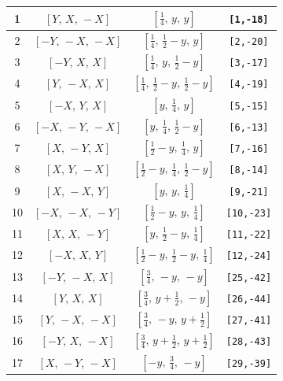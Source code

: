 \documentclass[fleqn,8pt]{jsarticle}
\begin{document}
\begin{longtable}{cccc}
1 & $\left[ Y,\, X,\, - X \right]$ & $\left[ \frac{1}{4},\, y,\, y \right]$ & {\tt [1,-18]} \\ \hline
2 & $\left[ - Y,\, - X,\, - X \right]$ & $\left[ \frac{1}{4},\, \frac{1}{2} - y,\, y \right]$ & {\tt [2,-20]} \\ \hline
3 & $\left[ - Y,\, X,\, X \right]$ & $\left[ \frac{1}{4},\, y,\, \frac{1}{2} - y \right]$ & {\tt [3,-17]} \\ \hline
4 & $\left[ Y,\, - X,\, X \right]$ & $\left[ \frac{1}{4},\, \frac{1}{2} - y,\, \frac{1}{2} - y \right]$ & {\tt [4,-19]} \\ \hline
5 & $\left[ - X,\, Y,\, X \right]$ & $\left[ y,\, \frac{1}{4},\, y \right]$ & {\tt [5,-15]} \\ \hline
6 & $\left[ - X,\, - Y,\, - X \right]$ & $\left[ y,\, \frac{1}{4},\, \frac{1}{2} - y \right]$ & {\tt [6,-13]} \\ \hline
7 & $\left[ X,\, - Y,\, X \right]$ & $\left[ \frac{1}{2} - y,\, \frac{1}{4},\, y \right]$ & {\tt [7,-16]} \\ \hline
8 & $\left[ X,\, Y,\, - X \right]$ & $\left[ \frac{1}{2} - y,\, \frac{1}{4},\, \frac{1}{2} - y \right]$ & {\tt [8,-14]} \\ \hline
9 & $\left[ X,\, - X,\, Y \right]$ & $\left[ y,\, y,\, \frac{1}{4} \right]$ & {\tt [9,-21]} \\ \hline
10 & $\left[ - X,\, - X,\, - Y \right]$ & $\left[ \frac{1}{2} - y,\, y,\, \frac{1}{4} \right]$ & {\tt [10,-23]} \\ \hline
11 & $\left[ X,\, X,\, - Y \right]$ & $\left[ y,\, \frac{1}{2} - y,\, \frac{1}{4} \right]$ & {\tt [11,-22]} \\ \hline
12 & $\left[ - X,\, X,\, Y \right]$ & $\left[ \frac{1}{2} - y,\, \frac{1}{2} - y,\, \frac{1}{4} \right]$ & {\tt [12,-24]} \\ \hline
13 & $\left[ - Y,\, - X,\, X \right]$ & $\left[ \frac{3}{4},\, - y,\, - y \right]$ & {\tt [25,-42]} \\ \hline
14 & $\left[ Y,\, X,\, X \right]$ & $\left[ \frac{3}{4},\, y + \frac{1}{2},\, - y \right]$ & {\tt [26,-44]} \\ \hline
15 & $\left[ Y,\, - X,\, - X \right]$ & $\left[ \frac{3}{4},\, - y,\, y + \frac{1}{2} \right]$ & {\tt [27,-41]} \\ \hline
16 & $\left[ - Y,\, X,\, - X \right]$ & $\left[ \frac{3}{4},\, y + \frac{1}{2},\, y + \frac{1}{2} \right]$ & {\tt [28,-43]} \\ \hline
17 & $\left[ X,\, - Y,\, - X \right]$ & $\left[ - y,\, \frac{3}{4},\, - y \right]$ & {\tt [29,-39]} \\ \hline

\end{longtable}
\end{document}
